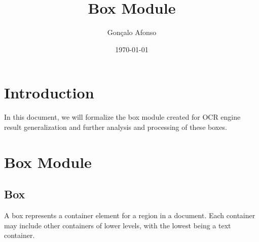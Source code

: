 \documentclass{article}
\title{Box Module}
\author{Gonçalo Afonso}
\date{\today}
\begin{document}
\maketitle

\section{Introduction}

In this document, we will formalize the box module created for OCR engine result generalization and further analysis 
and processing of these boxes.

\section{Box Module}

\subsection{Box}

A box represents a container element for a region in a document. Each container may include other containers of lower levels, 
with the lowest being a text container.
\end{document}
